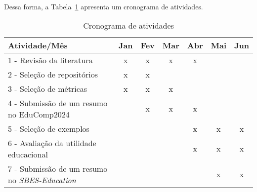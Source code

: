 Dessa forma, a Tabela~\ref{table:schedule} apresenta um cronograma de atividades.

\begin{table}[h]
\centering
\caption{Cronograma de atividades}
\label{table:schedule}
\begin{tabular}{lcccccc}
Atividade/Mês & Jan & Fev & Mar & Abr & Mai & Jun  \\
\hline
1 - Revisão da literatura & x & x & x & x & & \\
2 - Seleção de repositórios & x & x & & & & \\
3 - Seleção de métricas & x & x & x & & & \\
4 - Submissão de um resumo no EduComp2024 & & x & x & x & & \\
5 - Seleção de exemplos & & & & x & x & x \\
6 - Avaliação da utilidade educacional & & & & x & x & x \\
7 - Submissão de um resumo no \textit{SBES-Education} & & & & & x & x
\end{tabular}
\end{table}
